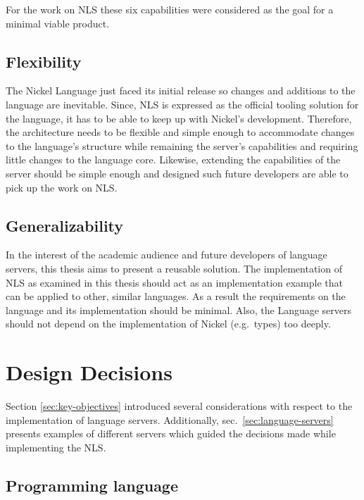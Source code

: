\documentclass[
  a4paper,
  bibtex,
  english,
  nomenclature]{kthlatex/kththesis/kththesis}
\begin{document}
For the work on NLS these six capabilities were considered as the goal
for a minimal viable product.

\hypertarget{sec:flexibility}{%
\subsection{Flexibility}\label{sec:flexibility}}

The Nickel Language just faced its initial release so changes and
additions to the language are inevitable. Since, NLS is expressed as the
official tooling solution for the language, it has to be able to keep up
with Nickel's development. Therefore, the architecture needs to be
flexible and simple enough to accommodate changes to the language's
structure while remaining the server's capabilities and requiring little
changes to the language core. Likewise, extending the capabilities of
the server should be simple enough and designed such future developers
are able to pick up the work on NLS.

\hypertarget{sec:generalizability}{%
\subsection{Generalizability}\label{sec:generalizability}}

In the interest of the academic audience and future developers of
language servers, this thesis aims to present a reusable solution. The
implementation of NLS as examined in this thesis should act as an
implementation example that can be applied to other, similar languages.
As a result the requirements on the language and its implementation
should be minimal. Also, the Language servers should not depend on the
implementation of Nickel (e.g.~types) too deeply.

\hypertarget{sec:design-decisions}{%
\section{Design Decisions}\label{sec:design-decisions}}

Section \ref{sec:key-objectives} introduced several considerations with
respect to the implementation of language servers. Additionally,
sec.~\ref{sec:language-servers} presents examples of different servers
which guided the decisions made while implementing the NLS.

\hypertarget{sec:programming-language}{%
\subsection{Programming language}\label{sec:programming-language}}
\end{document}
